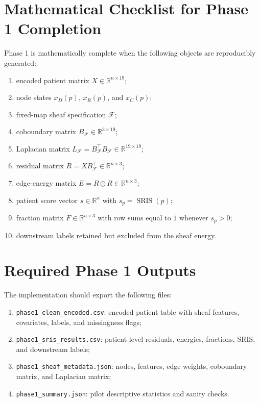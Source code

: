 \documentclass[11pt]{article}
\newcommand{\R}{\mathbb{R}}
\newcommand{\F}{\mathcal{F}}
\newcommand{\BF}{B_{\mathcal{F}}}
\newcommand{\LF}{L_{\mathcal{F}}}
\newcommand{\SRIS}{\operatorname{SRIS}}
\begin{document}
\section{Mathematical Checklist for Phase 1 Completion}

Phase 1 is mathematically complete when the following objects are reproducibly generated:
\begin{enumerate}[leftmargin=1.2cm]
    \item encoded patient matrix $X\in\R^{n\times 19}$;
    \item node states $x_D(p)$, $x_R(p)$, and $x_C(p)$;
    \item fixed-map sheaf specification $\F$;
    \item coboundary matrix $\BF\in\R^{3\times 19}$;
    \item Laplacian matrix $\LF=\BF^\top\BF\in\R^{19\times 19}$;
    \item residual matrix $R=X\BF^\top\in\R^{n\times 3}$;
    \item edge-energy matrix $E=R\odot R\in\R^{n\times 3}$;
    \item patient score vector $s\in\R^n$ with $s_p=\SRIS(p)$;
    \item fraction matrix $F\in\R^{n\times 3}$ with row sums equal to $1$ whenever $s_p>0$;
    \item downstream labels retained but excluded from the sheaf energy.
\end{enumerate}

\section{Required Phase 1 Outputs}

The implementation should export the following files:
\begin{enumerate}[leftmargin=1.2cm]
    \item \texttt{phase1\_clean\_encoded.csv}: encoded patient table with sheaf features, covariates, labels, and missingness flags;
    \item \texttt{phase1\_sris\_results.csv}: patient-level residuals, energies, fractions, SRIS, and downstream labels;
    \item \texttt{phase1\_sheaf\_metadata.json}: nodes, features, edge weights, coboundary matrix, and Laplacian matrix;
    \item \texttt{phase1\_summary.json}: pilot descriptive statistics and sanity checks.
\end{enumerate}
\end{document}
